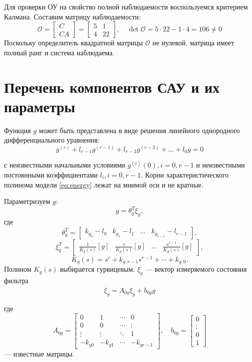 Для проверки ОУ на свойство полной наблюдаемости воспользуемся критерием Калмана. Составим
матрицу наблюдаемости:
$$
\mathcal{O}=
\begin{bmatrix}
    C \\ CA
\end{bmatrix}=
\begin{bmatrix}
    5 & 1 \\
    4 & 22
\end{bmatrix},\quad
\operatorname{det}\mathcal{O}=5\cdot22-1\cdot4=106\neq0
$$
Поскольку определитель квадратной матрицы $\mathcal{O}$ не нулевой, матрица имеет полный ранг
и система наблюдаема.

\section{Перечень компонентов САУ и их параметры}
Функция  $g$ может быть представлена в виде решения линейного однородного дифференциального
уравнения:
\begin{equation}
g^{(r)}+l_{r-1}g^{(r-1)}+l_{r-2}g^{(r-2)}+\dots+l_0g=0
\label{eq:energy}
\end{equation}

с неизвестными начальными условиями $g^{(i)}(0),i=\overline{0,r-1}$ и
неизвестными постоянными коэффициентами $l_i,i=\overline{0,r-1}$. Корни характеристического
полинома модели \eqref{eq:energy} лежат на мнимой оси и не кратные.

Параметризуем $g$:
\begin{equation}
    g=\theta_g^T\xi_g,
\label{eq:parametrization}
\end{equation}
где
$$
\theta_g^T=
\begin{bmatrix}
    k_{g_0}-l_0 & k_{g_1}-l_1 & \dots & k_{g_{r-1}} - l_{r-1}
\end{bmatrix},
$$$$
\xi_g^T=
\begin{bmatrix}
    \frac{1}{K_g(s)}\left[g\right] &\frac{s}{K_g(s)}\left[g\right] & \dots & \frac{s^{r-1}}{K_g(s)}\left[g\right]
\end{bmatrix},
$$$$
K_g(s)=s^r+k_{g,r-1}s^{r-1}+\cdots+k_{g,0}.
$$
Полином $K_g(s)$ выбирается гурвицевым.
$\xi_g$ --- вектор измеряемого состояния фильтра
\begin{equation}
    \dot{\xi_g}=A_{0g}\xi_g+b_{0g}g
    \label{eq:filter_xi}
\end{equation}

где
\begin{equation}
A_{0g}=
\begin{bmatrix}
    0 & 1 & \cdots & 0 \\
    0 & 0 & \cdots & \vdots \\
    \vdots & \vdots & \ddots & 1 \\
    -k_{g0} & -k_{g1} & \cdots & -k_{gr-1}
\end{bmatrix},\quad
b_{0g}=
\begin{bmatrix}
    0 \\
    \vdots \\
    0 \\
    1
\end{bmatrix}
\label{eq:observer_matrices}
\end{equation}
--- известные матрицы.


